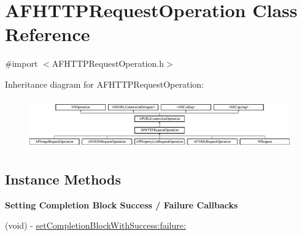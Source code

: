 \hypertarget{interface_a_f_h_t_t_p_request_operation}{\section{A\-F\-H\-T\-T\-P\-Request\-Operation Class Reference}
\label{interface_a_f_h_t_t_p_request_operation}
}


{\ttfamily \#import $<$A\-F\-H\-T\-T\-P\-Request\-Operation.\-h$>$}

Inheritance diagram for A\-F\-H\-T\-T\-P\-Request\-Operation\-:\begin{figure}[H]
\begin{center}
\leavevmode
\includegraphics[height=2.185366cm]{interface_a_f_h_t_t_p_request_operation}
\end{center}
\end{figure}
\subsection*{Instance Methods}
\begin{Indent}{\bf Setting Completion Block Success / Failure Callbacks}\par
{\em 

 

 }\begin{DoxyCompactItemize}
\item 
(void) -\/ \hyperlink{interface_a_f_h_t_t_p_request_operation_a2b9008e6fb9fc14bf7052b26cdfad80c}{set\-Completion\-Block\-With\-Success\-:failure\-:}
\end{DoxyCompactItemize}
\end{Indent}
